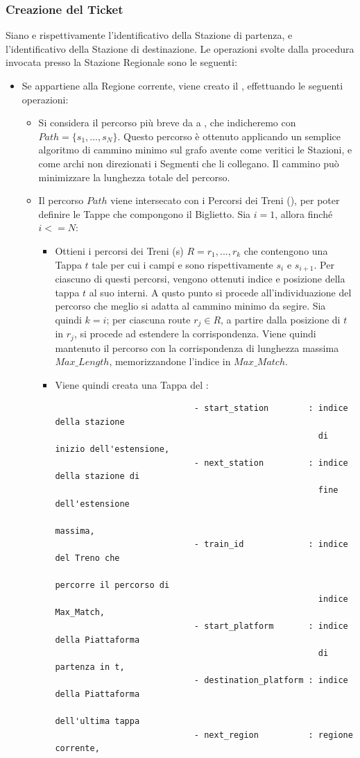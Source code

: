 	\subsubsection {Creazione del Ticket}
	
	Siano  e  rispettivamente l'identificativo della Stazione di partenza, e l'identificativo della Stazione di destinazione. Le operazioni svolte dalla procedura invocata presso la Stazione Regionale sono le seguenti:
	\begin{itemize}
		\item Se  appartiene alla Regione corrente, viene creato il , effettuando le seguenti operazioni:
			\begin {itemize}
					
				\item Si considera il percorso più breve da  a , che indicheremo con $Path = \{s_1,...,s_N\}$. Questo percorso è ottenuto applicando un semplice algoritmo di cammino minimo sul grafo avente come veritici le Stazioni, e come archi non direzionati i Segmenti che li collegano. Il cammino può minimizzare la lunghezza totale del percorso.
				
				\item Il percorso $Path$ viene intersecato con i Percorsi dei Treni (), per poter definire le Tappe che compongono il Biglietto. Sia $i=1$, allora finché $i<=N$:
					\begin{itemize}
						\item Ottieni i percorsi dei Treni (s) $R={r_1,...,r_k}$ che contengono una Tappa $t$ tale per cui i campi  e  sono rispettivamente $s_i$ e $s_{i+1}$. Per ciascuno di questi percorsi, vengono ottenuti indice e posizione della tappa $t$ al suo interni.
						A qusto punto si procede all'individuazione del percorso che meglio si adatta al cammino minimo da segire. Sia quindi $k = i$; per ciascuna route $r_j \in R$, a partire dalla posizione di $t$ in $r_j$, si procede ad estendere la corrispondenza. Viene quindi mantenuto il percorso con la corrispondenza di lunghezza massima $Max\_Length$, memorizzandone l'indice in $Max\_Match$.
						\item Viene quindi creata una Tappa del :
						\begin{verbatim}
							- start_station        : indice della stazione 
							                         di inizio dell'estensione,
							- next_station         : indice della stazione di
							                         fine dell'estensione 
							                         massima,
							- train_id             : indice del Treno che 
							                         percorre il percorso di 
							                         indice Max_Match,
							- start_platform       : indice della Piattaforma
							                         di partenza in t,
							- destination_platform : indice della Piattaforma 
							                         dell'ultima tappa
							- next_region          : regione corrente,
							

\end{verbatim}
\end{itemize}
\end{itemize}
\end{itemize}
